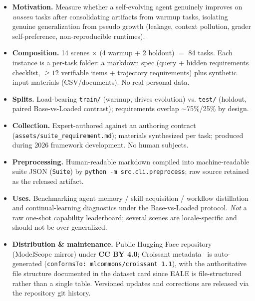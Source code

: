 \documentclass{article}
\begin{document}
\begin{itemize}
\item \textbf{Motivation.} Measure whether a self-evolving agent genuinely improves on \emph{unseen} tasks after consolidating artifacts from warmup tasks, isolating genuine generalization from pseudo growth (leakage, context pollution, grader self-preference, non-reproducible runtimes).
\item \textbf{Composition.} 14 scenes $\times$ (4 warmup + 2 holdout) $=$ 84 tasks. Each instance is a per-task folder: a markdown spec (query + hidden requirements checklist, $\geq 12$ verifiable items + trajectory requirements) plus synthetic input materials (CSV/documents). No real personal data.
\item \textbf{Splits.} Load-bearing \texttt{train/} (warmup, drives evolution) vs. \texttt{test/} (holdout, paired Base-vs-Loaded contrast); requirements overlap $\sim$75\%/25\% by design.
\item \textbf{Collection.} Expert-authored against an authoring contract (\texttt{assets/suite\_requirement.md}); materials synthesized per task; produced during 2026 framework development. No human subjects.
\item \textbf{Preprocessing.} Human-readable markdown compiled into machine-readable suite JSON (\texttt{Suite}) by \texttt{python -m src.cli.preprocess}; raw source retained as the released artifact.
\item \textbf{Uses.} Benchmarking agent memory / skill acquisition / workflow distillation and continual-learning diagnostics under the Base-vs-Loaded protocol. \emph{Not} a raw one-shot capability leaderboard; several scenes are locale-specific and should not be over-generalized.
\item \textbf{Distribution \& maintenance.} Public Hugging Face repository (ModelScope mirror) under \textbf{CC BY 4.0}; Croissant metadata~\citep{akhtar2024croissant} is auto-generated (\texttt{conformsTo: mlcommons/croissant 1.1}), with the authoritative file structure documented in the dataset card since EALE is file-structured rather than a single table. Versioned updates and corrections are released via the repository git history.
\end{itemize}




\end{document}

